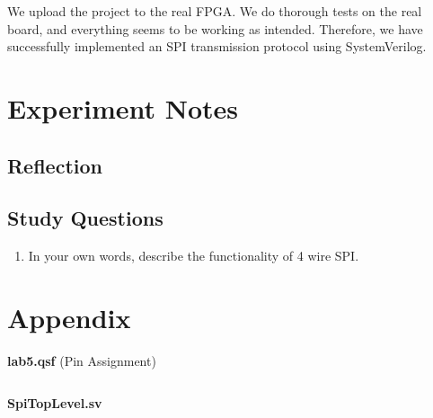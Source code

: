 \documentclass[12pt]{article}
\begin{document}
We upload the project to the real FPGA. We do thorough tests on the real board, and everything seems to be working as intended. Therefore, we have successfully implemented an SPI transmission protocol using SystemVerilog.

\section{Experiment Notes}

\subsection*{Reflection}

\subsection*{Study Questions}

\begin{enumerate}
  \item In your own words, describe the functionality of 4 wire SPI.

\end{enumerate}

\section*{Appendix} \label{section:Appendix}

\begin{center}
  \textbf{lab5.qsf} (Pin Assignment)
\end{center}

\inputminted[breaklines, firstline=38, fontfamily=tt, fontsize=\small, frame=lines, framesep=1.5em, linenos, numbersep=1.5em, style=vs]{text}{lab5/lab5.qsf}

\begin{center}
  \textbf{SpiTopLevel.sv}
\end{center}
\end{document}

